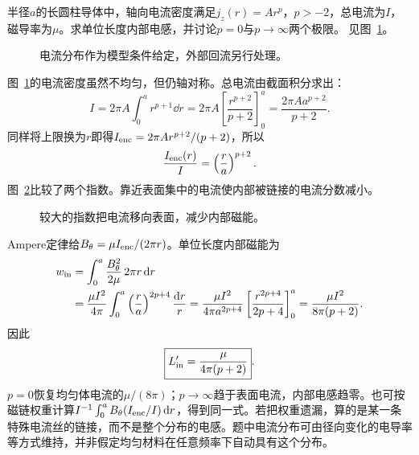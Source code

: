 \begin{exercise}[非均匀体电流的内部电感]\label{ex:i2-h3}
半径$a$的长圆柱导体中，轴向电流密度满足$j_z(r)=Ar^p$，$p>-2$，总电流为$I$，磁导率为$\mu$。求单位长度内部电感，并讨论$p=0$与$p\to\infty$两个极限。 见图~\ref{fig:i2-h3-q}。
\end{exercise}

\begin{figure}[H]\centering
{}
\caption{电流分布作为模型条件给定，外部回流另行处理。}\label{fig:i2-h3-q}
\end{figure}
\begin{solution}
图~\ref{fig:i2-h3-q}的电流密度虽然不均匀，但仍轴对称。总电流由截面积分求出：
\[I=2\pi A\int_0^ar^{p+1}\dd r
=2\pi A\left[\frac{r^{p+2}}{p+2}\right]_0^a
=\frac{2\pi Aa^{p+2}}{p+2}.\]
同样将上限换为$r$即得$I_{\rm enc}=2\pi Ar^{p+2}/(p+2)$，所以
\[\frac{I_{\rm enc}(r)}I=\left(\frac ra\right)^{p+2}.
\]
图~\ref{fig:i2-h3-s}比较了两个指数。靠近表面集中的电流使内部被链接的电流分数减小。


\begin{figure}[H]\centering
{}
\caption{较大的指数把电流移向表面，减少内部磁能。}\label{fig:i2-h3-s}
\end{figure}

Ampere定律给$B_\theta=\mu I_{\rm enc}/(2\pi r)$。单位长度内部磁能为
\[\begin{aligned}
w_{\rm in}&=\int_0^a\frac{B_\theta^2}{2\mu}\,2\pi r\mathop{}\!\mathrm d r\\
&=\frac{\mu I^2}{4\pi}\int_0^a
\left(\frac ra\right)^{2p+4}\frac{\mathop{}\!\mathrm d r}{r}
=\frac{\mu I^2}{4\pi a^{2p+4}}\left[\frac{r^{2p+4}}{2p+4}\right]_0^a
=\frac{\mu I^2}{8\pi(p+2)}.
\end{aligned}\]
因此
\[\boxed{L'_{\rm in}=\frac{\mu}{4\pi(p+2)}}.
\]
$p=0$恢复均匀体电流的$\mu/(8\pi)$；$p\to\infty$趋于表面电流，内部电感趋零。也可按磁链权重计算$I^{-1}\int_0^aB_\theta(I_{\rm enc}/I)\mathop{}\!\mathrm d r$，得到同一式。若把权重遗漏，算的是某一条特殊电流丝的链接，而不是整个分布的电感。题中电流分布可由径向变化的电导率等方式维持，并非假定均匀材料在任意频率下自动具有这个分布。
\end{solution}

